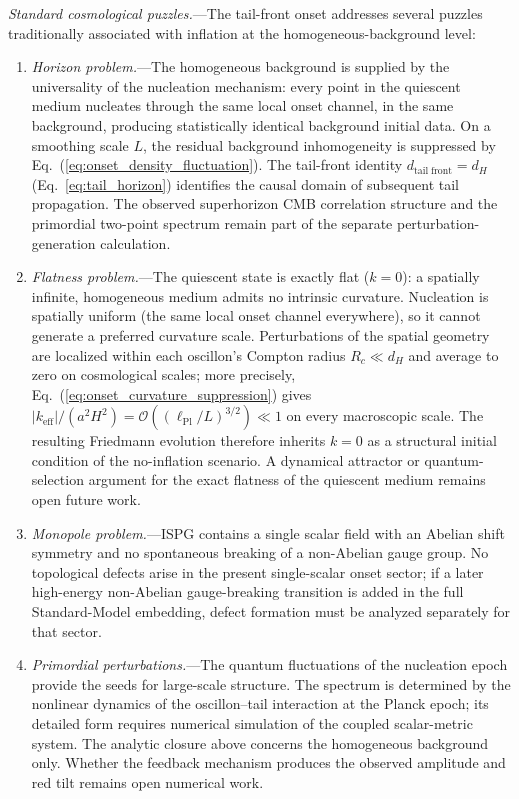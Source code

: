 \documentclass[aps,prd,onecolumn,superscriptaddress,nofootinbib,showpacs,12pt,notitlepage]{revtex4-2}
\renewcommand{\order}[1]{\mathcal{O}\!\left(#1\right)}
\begin{document}
\textit{Standard cosmological puzzles.}---The
tail-front onset addresses several puzzles traditionally
associated with inflation at the homogeneous-background
level:
\begin{enumerate}
\item \textit{Horizon problem.}---The homogeneous
  background is supplied by the universality of the
  nucleation mechanism: every point in the quiescent
  medium nucleates through the same local onset channel,
  in the same background, producing statistically
  identical background initial data.  On a smoothing
  scale $L$, the residual background inhomogeneity is
  suppressed by Eq.~(\ref{eq:onset_density_fluctuation}).
  The tail-front identity
  $d_{\mathrm{tail\;front}} = d_H$
  (Eq.~\ref{eq:tail_horizon}) identifies the causal
  domain of subsequent tail propagation.  The observed
  superhorizon CMB correlation structure and the
  primordial two-point spectrum remain part of the
  separate perturbation-generation calculation.
\item \textit{Flatness problem.}---The quiescent state is
  exactly flat ($k = 0$): a spatially infinite,
  homogeneous medium admits no intrinsic curvature.
  Nucleation is spatially uniform (the same local onset
  channel everywhere), so it cannot generate a preferred
  curvature scale.  Perturbations of the spatial
  geometry are localized within each oscillon's Compton
  radius $R_c \ll d_H$ and average to zero on
  cosmological scales; more precisely,
  Eq.~(\ref{eq:onset_curvature_suppression}) gives
  $|k_{\mathrm{eff}}|/(a^2H^2)
  = \order{(\ell_{\mathrm{Pl}}/L)^{3/2}} \ll 1$ on every
  macroscopic scale.  The resulting
  Friedmann evolution therefore inherits $k = 0$ as a
  structural initial condition of the no-inflation
  scenario.  A dynamical attractor or quantum-selection
  argument for the exact flatness of the quiescent
  medium remains open future work.
\item \textit{Monopole problem.}---ISPG contains a single
  scalar field with an Abelian shift symmetry and no
  spontaneous breaking of a non-Abelian gauge group.
  No topological defects arise in the present
  single-scalar onset sector; if a later high-energy
  non-Abelian gauge-breaking transition is added in the
  full Standard-Model embedding, defect formation must be
  analyzed separately for that sector.
\item \textit{Primordial perturbations.}---The quantum
  fluctuations of the nucleation epoch provide the seeds
  for large-scale structure.  The spectrum is determined
  by the nonlinear dynamics of the oscillon--tail
  interaction at the Planck epoch; its detailed form
  requires numerical simulation of the coupled
  scalar-metric system.  The analytic closure above
  concerns the homogeneous background only.  Whether the
  feedback mechanism produces the observed amplitude and
  red tilt remains open numerical work.
\end{enumerate}
\end{document}
